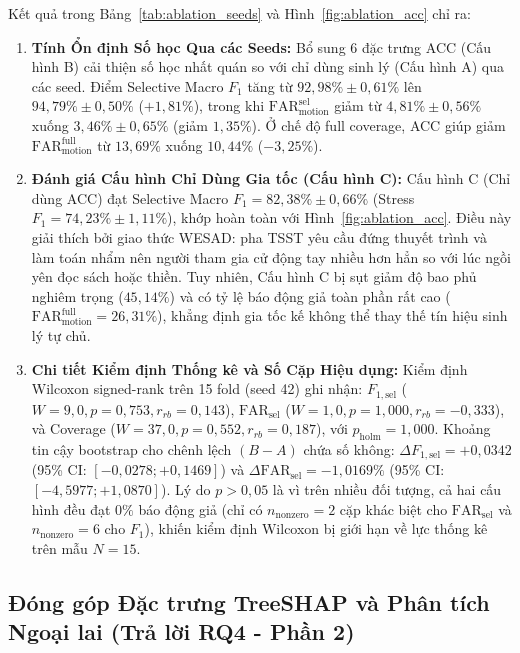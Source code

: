 \documentclass[conference]{IEEEtran}
\begin{document}
Kết quả trong Bảng~\ref{tab:ablation_seeds} và Hình~\ref{fig:ablation_acc} chỉ ra:
\begin{enumerate}
    \item \textbf{Tính Ổn định Số học Qua các Seeds:} Bổ sung 6 đặc trưng ACC (Cấu hình B) cải thiện số học nhất quán so với chỉ dùng sinh lý (Cấu hình A) qua các seed. Điểm Selective Macro $F_1$ tăng từ $92,98\% \pm 0,61\%$ lên $94,79\% \pm 0,50\%$ ($+1,81\%$), trong khi $\text{FAR}_{\text{motion}}^{\text{sel}}$ giảm từ $4,81\% \pm 0,56\%$ xuống $3,46\% \pm 0,65\%$ (giảm $1,35\%$). Ở chế độ full coverage, ACC giúp giảm $\text{FAR}_{\text{motion}}^{\text{full}}$ từ $13,69\%$ xuống $10,44\%$ ($-3,25\%$).
    \item \textbf{Đánh giá Cấu hình Chỉ Dùng Gia tốc (Cấu hình C):} Cấu hình C (Chỉ dùng ACC) đạt Selective Macro $F_1 = 82,38\% \pm 0,66\%$ (Stress $F_1 = 74,23\% \pm 1,11\%$), khớp hoàn toàn với Hình~\ref{fig:ablation_acc}. Điều này giải thích bởi giao thức WESAD: pha TSST yêu cầu đứng thuyết trình và làm toán nhẩm nên người tham gia cử động tay nhiều hơn hẳn so với lúc ngồi yên đọc sách hoặc thiền. Tuy nhiên, Cấu hình C bị sụt giảm độ bao phủ nghiêm trọng ($45,14\%$) và có tỷ lệ báo động giả toàn phần rất cao ($\text{FAR}_{\text{motion}}^{\text{full}} = 26,31\%$), khẳng định gia tốc kế không thể thay thế tín hiệu sinh lý tự chủ.
    \item \textbf{Chi tiết Kiểm định Thống kê và Số Cặp Hiệu dụng:} Kiểm định Wilcoxon signed-rank trên 15 fold (seed 42) ghi nhận: $F_{1,\text{sel}}$ ($W = 9,0, p = 0,753, r_{rb} = 0,143$), $\text{FAR}_{\text{sel}}$ ($W = 1,0, p = 1,000, r_{rb} = -0,333$), và Coverage ($W = 37,0, p = 0,552, r_{rb} = 0,187$), với $p_{\text{holm}} = 1,000$. Khoảng tin cậy bootstrap cho chênh lệch $(B - A)$ chứa số không: $\Delta F_{1,\text{sel}} = +0,0342$ (95\% CI: $[-0,0278; +0,1469]$) và $\Delta \text{FAR}_{\text{sel}} = -1,0169\%$ (95\% CI: $[-4,5977; +1,0870]$). Lý do $p > 0,05$ là vì trên nhiều đối tượng, cả hai cấu hình đều đạt $0\%$ báo động giả (chỉ có $n_{\text{nonzero}} = 2$ cặp khác biệt cho $\text{FAR}_{\text{sel}}$ và $n_{\text{nonzero}} = 6$ cho $F_1$), khiến kiểm định Wilcoxon bị giới hạn về lực thống kê trên mẫu $N=15$.
\end{enumerate}

\subsection{Đóng góp Đặc trưng TreeSHAP và Phân tích Ngoại lai (Trả lời RQ4 - Phần 2)}
\end{document}
